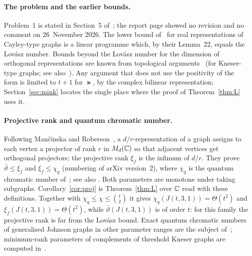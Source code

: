 
\paragraph{The problem and the earlier bounds.}
Problem~1 is stated in Section~5 of~\cite{HI}; the report page showed no revision and no comment on
26~November 2026. The lower bound of~\cite{HI} for real representations of Cayley-type graphs is a linear
programme which, by their Lemma~22, equals the Lov\'asz number. Bounds beyond the Lov\'asz number for the
dimension of orthogonal representations are known from topological arguments~\cite{Ha} (for Kneser-type
graphs; see also~\cite{GH}). Any argument that does not use the positivity of the form is limited to $t+1$ for
$\Gt$, by the complex bilinear representation; Section~\ref{sec:mink} locates the single place where the
proof of Theorem~\ref{thm:L} uses it.

\paragraph{Projective rank and quantum chromatic number.}
Following Man\v{c}inska and Roberson~\cite[Section~6]{MR}, a $d/r$-representation of a graph assigns to each
vertex a projector of rank $r$ in $M_d(\mathbb{C})$ so that adjacent vertices get orthogonal projectors; the projective
rank $\xi_f$ is the infimum of $d/r$. They prove $\bar\vartheta\le\xi_f$ \cite[Theorem~6.4]{MR} and
$\xi_f\le\chi_q$ \cite[Lemma~6.2]{MR} (numbering of arXiv version~2), where $\chi_q$ is the quantum chromatic number of~\cite{CMNSW}; see also
\cite[Section~3]{GdLL}. Both parameters are monotone under taking subgraphs. Corollary~\ref{cor:proj} is
Theorem~\ref{thm:L} over $\mathbb{C}$ read with these definitions. Together with $\chi_q\le\chi\le\binom t2$ it gives
$\chi_q(J(t,3,1))=\Theta(t^2)$ and $\xi_f(J(t,3,1))=\Theta(t^2)$, while $\bar\vartheta(J(t,3,1))$ is of order
$t$: for this family the projective rank is far from the Lov\'asz bound. Exact quantum chromatic numbers of
generalised Johnson graphs in other parameter ranges are the subject of~\cite{LCLL}; minimum-rank parameters
of complements of threshold Kneser graphs are computed in~\cite{HT}.

